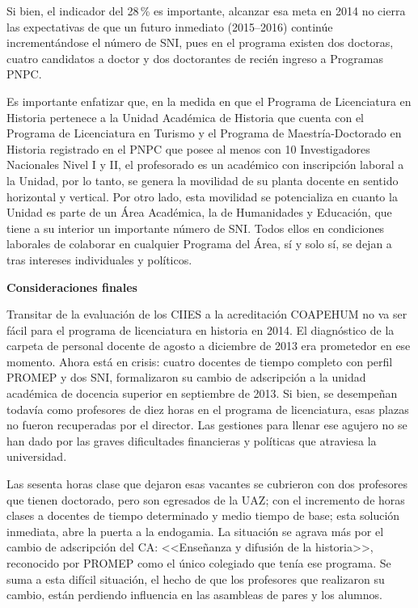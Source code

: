  
Si bien, el indicador del 28\,\% es importante, alcanzar esa meta en 2014 no
cierra las expectativas de que un futuro inmediato (2015--2016) continúe
incrementándose el número de SNI, pues en el programa existen dos doctoras,
cuatro candidatos a doctor y dos doctorantes de recién ingreso a Programas
PNPC. 

 
Es importante enfatizar que, en la medida en que el Programa de Licenciatura
en Historia pertenece a la Unidad Académica de Historia que cuenta con el
Programa de Licenciatura en Turismo y el Programa de Maestría-Doctorado en
Historia registrado en el PNPC que posee al menos con 10 Investigadores
Nacionales Nivel I y II, el profesorado es un académico con inscripción
laboral a la Unidad, por lo tanto, se genera la movilidad de su planta
docente en sentido horizontal y vertical. Por otro lado, esta movilidad se
potencializa en cuanto la Unidad es parte de un Área Académica, la de
Humanidades y Educación, que tiene a su interior un importante número de
SNI. Todos ellos en condiciones laborales de colaborar en cualquier
Programa del Área, sí y solo sí, se dejan a tras intereses individuales y
políticos. 


\bigskip
\textbf{Consideraciones finales}

\enlargethispage{1\baselineskip} 
Transitar de la evaluación de los CIIES a la acreditación COAPEHUM  no va
ser fácil para el programa de licenciatura en historia en 2014. El
diagnóstico de la carpeta de personal docente de agosto a diciembre de 2013
era prometedor en ese momento. Ahora está en crisis: cuatro docentes de
tiempo completo con  perfil PROMEP y dos SNI, formalizaron su cambio de
adscripción a la unidad académica de docencia superior en septiembre de
2013. Si bien, se desempeñan todavía como profesores de diez horas en el
programa de licenciatura, esas plazas no fueron recuperadas por el
director. Las gestiones para llenar ese agujero no se han dado por las
graves dificultades financieras y políticas que atraviesa la universidad. 

 
Las sesenta horas clase que dejaron esas vacantes se cubrieron con dos
profesores que tienen doctorado, pero son egresados de la UAZ; con el
incremento de horas clases a docentes de tiempo determinado y medio tiempo
de base; esta solución inmediata, abre la puerta a la endogamia. La
situación se agrava más por el cambio de adscripción del CA: <<Enseñanza y
difusión de la historia>>, reconocido por PROMEP como el único colegiado que
tenía ese programa. Se suma a esta difícil situación, el hecho de que los
profesores que realizaron su cambio, están perdiendo influencia en las
asambleas de pares y los alumnos.

